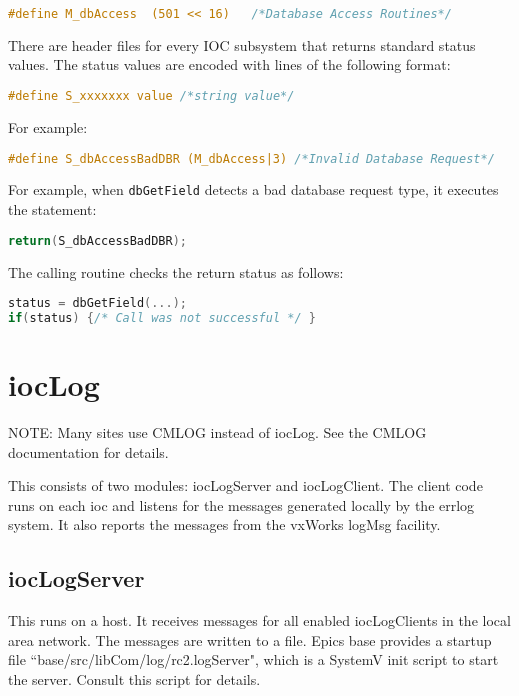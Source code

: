 \begin{lstlisting}[language=C]
#define M_dbAccess  (501 << 16)   /*Database Access Routines*/
\end{lstlisting}

There are header files for every IOC subsystem that returns standard status values.
The status values are encoded with lines of the following format:

\begin{lstlisting}[language=C]
#define S_xxxxxxx value /*string value*/
\end{lstlisting}

For example:

\begin{lstlisting}[language=C]
#define S_dbAccessBadDBR (M_dbAccess|3) /*Invalid Database Request*/
\end{lstlisting}

For example, when \verb|dbGetField| detects a bad database request type, it executes the statement:

\begin{lstlisting}[language=C]
return(S_dbAccessBadDBR);
\end{lstlisting}

The calling routine checks the return status as follows:

\begin{lstlisting}[language=C]
status = dbGetField(...);
if(status) {/* Call was not successful */ }
\end{lstlisting}

\section{iocLog}
\label{sec:iocLog}

NOTE: Many sites use CMLOG instead of iocLog.
See the CMLOG documentation for details.

This consists of two modules:
iocLogServer and iocLogClient.
The client code runs on each ioc and listens for the messages generated locally by the errlog system.
It also reports the messages from the vxWorks logMsg facility.

\subsection{iocLogServer}

This runs on a host.
It receives messages for all enabled iocLogClients in the local area network.
The messages are written to a file.
Epics base provides a startup file ``base/src/libCom/log/rc2.logServer", which is a SystemV init script to start the server.
Consult this script for details.

